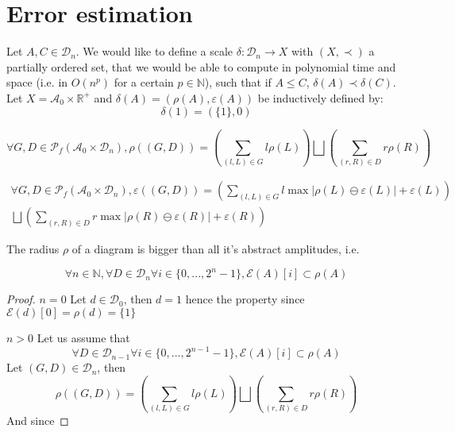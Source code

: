 \section{Error estimation}

Let $A, C \in \mathcal{D}_n$.
We would like to define a scale $\delta : \mathcal{D}_n \rightarrow X$ with $(X, \prec)$ a partially ordered set, that we would be able to compute in polynomial time and space (i.e. in $O(n^p)$ for a certain $p \in \mathbb{N}$), such that if $A \le C$, $\delta(A) \prec \delta(C)$.
Let $X = \mathcal{A}_0 \times \mathbb{R}^+$ and $\delta(A) = (\rho(A), \varepsilon(A))$ be inductively defined by:
$$\delta(\boxed{1}) = (\{1\}, 0)$$

$$\forall G, D \in \mathscr{P}_f(\mathcal{A}_0 \times \mathcal{D}_n),
\rho((G, D))
= \left(\sum_{(l, L) \in G} l \rho(L) \right) \bigsqcup \left(\sum_{(r, R) \in D} r \rho(R) \right)$$

\begin{multline*}
\forall G, D \in \mathscr{P}_f(\mathcal{A}_0 \times \mathcal{D}_n),
\varepsilon((G, D))
= \left(\sum_{(l, L) \in G} l \max|\rho(L) \ominus \varepsilon(L)| + \varepsilon(L)\right) \\
\bigsqcup \left(\sum_{(r, R) \in D} r \max|\rho(R) \ominus \varepsilon(R)| + \varepsilon(R)\right)
\end{multline*}

\begin{prop}
    The radius $\rho$ of a diagram is bigger than all it's abstract amplitudes, i.e.

    $$
        \forall n \in \mathbb N,
        \forall D \in \mathcal{D}_n
        \forall i \in \{0, ..., 2^n-1\},
        \mathcal E(A)[i] \subset \rho(A)
    $$

    \begin{proof}
        $\boxed{n = 0}$
            Let $d \in \mathcal{D}_0$,
            then $d = \boxed{1}$
            hence the property since $\mathcal E(d)[0] = \rho(d) = \{1\}$

        \noindent $\boxed{n > 0}$
            Let us assume that
            $$\forall D \in \mathcal{D}_{n-1}
            \forall i \in \{0, ..., 2^{n-1}-1\},
            \mathcal E(A)[i] \subset \rho(A)$$
            Let $(G, D) \in \mathcal{D}_n$, then
            $$\rho((G, D))
            = \left(\sum_{(l, L) \in G} l \rho(L) \right) \bigsqcup \left(\sum_{(r, R) \in D} r \rho(R) \right)$$
            And since
        \end{proof}
\end{prop}

